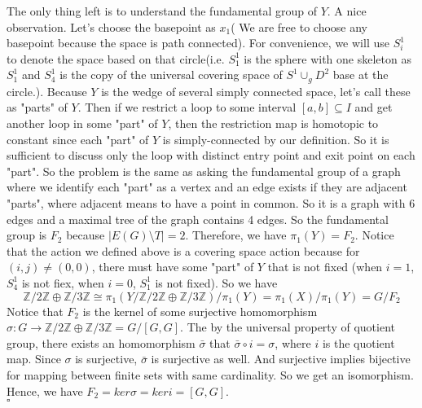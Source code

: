 \documentclass[12pt]{amsart}
\newcommand{\Z}{\mathbb{Z}}
\begin{document}
The only thing left is to understand the fundamental group of $Y$. A nice observation. Let's choose the basepoint as $x_1$( We are free to choose any basepoint because the space is path connected). For convenience, we will use $S^1_i$ to denote the space based on that circle(i.e. $S^1_1$ is the sphere with one skeleton as $S^1_1$ and $S^1_4$ is the copy of the universal covering space of $S^1\cup_g D^2$ base at the circle.). Because $Y$ is the wedge of several simply connected space, let's call these as "parts" of $Y$. Then if we restrict a loop to some interval $[a,b]\subseteq I$ and get another loop in some "part" of $Y$, then the restriction map is homotopic to constant since each "part" of $Y$ is simply-connected by our definition. So it is sufficient to discuss only the loop with distinct entry point and exit point on each "part". So the problem is the same as asking the fundamental group of a graph where we identify each "part" as a vertex and an edge exists if they are adjacent "parts", where adjacent means to have a point in common. So it is a graph with 6 edges and a maximal tree of the graph contains 4 edges. So the fundamental group is $F_2$ because $|E(G)\setminus T|=2$. Therefore, we have $\pi_1(Y)=F_2$. Notice that the action we defined above is a covering space action because for $(i,j)\neq (0,0)$, there must have some "part" of $Y$ that is not fixed (when $i=1$, $S^1_4$ is not fiex, when $i=0$, $S^1_1$ is not fixed). So we have 
\[\Z/2\Z\oplus \Z/3\Z\cong \pi_1(Y/\Z/2\Z\oplus \Z/3\Z)/\pi_1(Y)=\pi_1(X)/\pi_1(Y)=G/F_2\]
Notice that $F_2$ is the kernel of some surjective homomorphism $\sigma:G\to \Z/2\Z\oplus \Z/3\Z=G/[G,G]$. The by the universal property of quotient group, there exists an homomorphism $\bar{\sigma}$ that $\bar{\sigma}\circ i=\sigma$, where $i$ is the quotient map. Since $\sigma$ is surjective, $\bar{\sigma}$ is surjective as well. And surjective implies bijective for mapping between finite sets with same cardinality. So we get an isomorphism. Hence, we have $F_2=ker\sigma=ker i=[G,G]$.
\\\phantom{qed}\hfill$\square$\\
\end{document}
